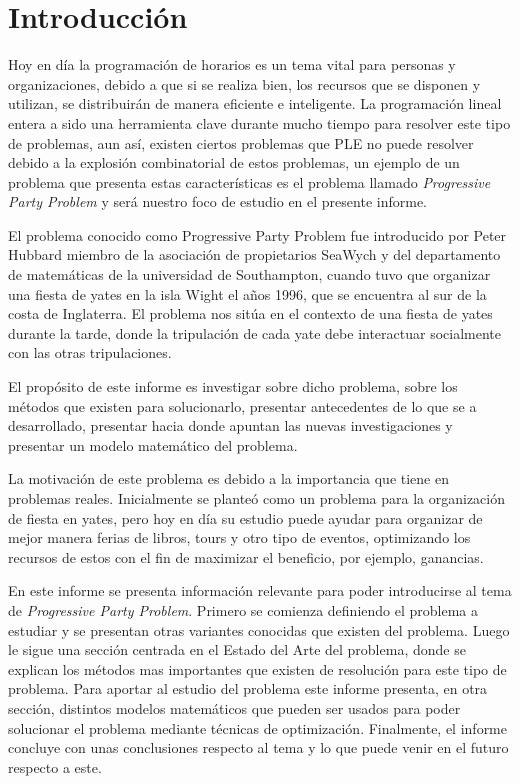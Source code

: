 \documentclass[spanish, fleqn]{article}
\begin{document}
\section{Introducción}

Hoy en día la programación de horarios es un tema vital para personas y organizaciones, debido a que si se realiza bien, los recursos que se disponen y utilizan, se distribuirán de manera eficiente e inteligente. La programación lineal entera a sido una herramienta clave durante mucho tiempo para resolver este tipo de problemas, aun así, existen ciertos problemas que PLE no puede resolver debido a la explosión combinatorial de estos problemas, un ejemplo de un problema que presenta estas características es el problema llamado \textit{Progressive Party Problem} y será nuestro foco de estudio en el presente informe.

El problema conocido como Progressive Party Problem fue introducido por Peter Hubbard miembro de la asociación de propietarios SeaWych y del departamento de matemáticas de la universidad de Southampton, cuando tuvo que organizar una fiesta de yates en la isla Wight el años 1996, que se encuentra al sur de la costa de Inglaterra. El problema nos sitúa en el contexto de una fiesta de yates durante la tarde, donde la tripulación de cada yate debe interactuar socialmente con las otras tripulaciones. 

El propósito de este informe es investigar sobre dicho problema, sobre los métodos que existen para solucionarlo, presentar antecedentes de lo que se a desarrollado, presentar hacia donde apuntan las nuevas investigaciones y presentar un modelo matemático del problema.

La motivación de este problema es debido a la importancia que tiene en problemas reales. Inicialmente se planteó como un problema para la organización de fiesta en yates, pero hoy en día su estudio puede ayudar para organizar de mejor manera ferias de libros, tours y otro tipo de eventos, optimizando los recursos de estos con el fin de maximizar el beneficio, por ejemplo, ganancias.

En este informe se presenta información relevante para poder introducirse al tema de \textit{Progressive Party Problem}. Primero se comienza definiendo el problema a estudiar y se presentan otras variantes conocidas que existen del problema. Luego le sigue una sección centrada en el Estado del Arte del problema, donde se explican los métodos mas importantes que existen de resolución para este tipo de problema. Para aportar al estudio del problema este informe presenta, en otra sección, distintos modelos matemáticos que pueden ser usados para poder solucionar el problema mediante técnicas de optimización. Finalmente, el informe concluye con unas conclusiones respecto al tema y lo que puede venir en el futuro respecto a este.
\end{document}
